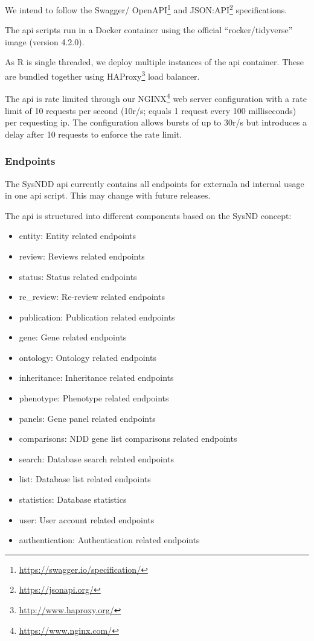 \documentclass[
]{article}
\providecommand{\tightlist}{%
  \setlength{\itemsep}{0pt}\setlength{\parskip}{0pt}}
\renewcommand{\href}[2]{#2\footnote{\url{#1}}}
\begin{document}
We intend to follow the \href{https://swagger.io/specification/}{Swagger/ OpenAPI} and \href{https://jsonapi.org/}{JSON:API} specifications.

The api scripts run in a Docker container using the official ``rocker/tidyverse'' image (version 4.2.0).

As R is single threaded, we deploy multiple instances of the api container. These are bundled together using \href{http://www.haproxy.org/}{HAProxy} load balancer.

The api is rate limited through our \href{https://www.nginx.com/}{NGINX} web server configuration with a rate limit of 10 requests per second (10r/s; equals 1 request every 100 milliseconds) per requesting ip. The configuration allows bursts of up to 30r/s but introduces a delay after 10 requests to enforce the rate limit.

\hypertarget{endpoints}{%
\subsubsection{Endpoints}\label{endpoints}}

The SysNDD api currently contains all endpoints for externala nd internal usage in one api script. This may change with future releases.

The api is structured into different components based on the SysND concept:

\begin{itemize}
\tightlist
\item
  entity: Entity related endpoints
\item
  review: Reviews related endpoints
\item
  status: Status related endpoints
\item
  re\_review: Re-review related endpoints
\item
  publication: Publication related endpoints
\item
  gene: Gene related endpoints
\item
  ontology: Ontology related endpoints
\item
  inheritance: Inheritance related endpoints
\item
  phenotype: Phenotype related endpoints
\item
  panels: Gene panel related endpoints
\item
  comparisons: NDD gene list comparisons related endpoints
\item
  search: Database search related endpoints
\item
  list: Database list related endpoints
\item
  statistics: Database statistics
\item
  user: User account related endpoints
\item
  authentication: Authentication related endpoints
\end{itemize}
\end{document}
